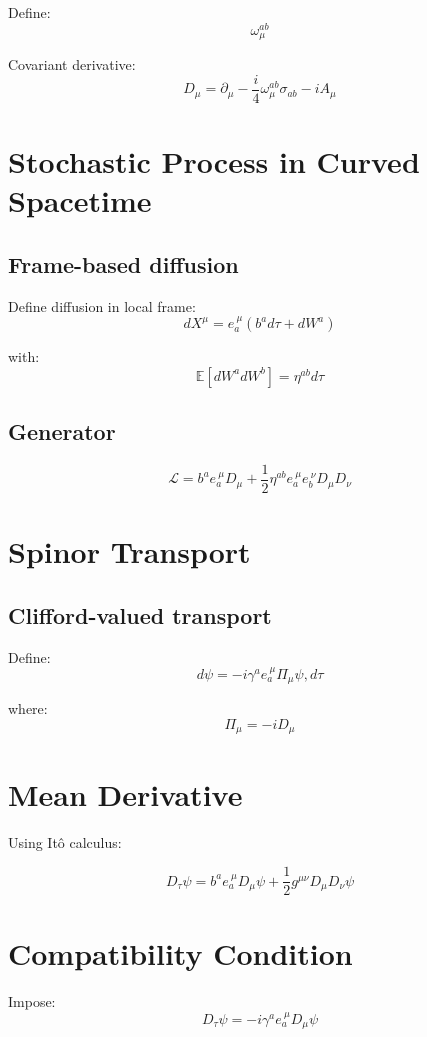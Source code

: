 \documentclass[11pt]{article}
\begin{document}
Define:
\[
\omega_\mu^{ab}
\]

Covariant derivative:
\[
D_\mu = \partial_\mu - \frac{i}{4}\omega_\mu^{ab}\sigma_{ab} - i A_\mu
\]

\section{Stochastic Process in Curved Spacetime}

\subsection{Frame-based diffusion}

Define diffusion in local frame:
\[
dX^\mu = e_a^{\ \mu} \left( b^a d\tau + dW^a \right)
\]

with:
\[
\mathbb{E}[dW^a dW^b] = \eta^{ab} d\tau
\]

\subsection{Generator}

\[
\mathcal{L} = b^a e_a^{\ \mu} D_\mu + \frac{1}{2} \eta^{ab} e_a^{\ \mu} e_b^{\ \nu} D_\mu D_\nu
\]

\section{Spinor Transport}

\subsection{Clifford-valued transport}

Define:
\[
d\psi = -i \gamma^a e_a^{\ \mu} \Pi_\mu \psi, d\tau
\]

where:
\[
\Pi_\mu = -i D_\mu
\]

\section{Mean Derivative}

Using It\^o calculus:

\[
D_\tau \psi =
b^a e_a^{\ \mu} D_\mu \psi
+ \frac{1}{2} g^{\mu\nu} D_\mu D_\nu \psi
  \]

\section{Compatibility Condition}

Impose:
\[
D_\tau \psi = -i \gamma^a e_a^{\ \mu} D_\mu \psi
\]
\end{document}
